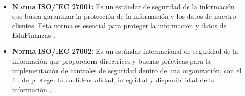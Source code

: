 \begin{itemize}
	\item \textbf{Norma ISO/IEC 27001:} Es un estándar de seguridad de la información que busca garantizar la protección de la información y los datos de nuestro clientes. Esta norma es esencial para proteger la información y datos de EduFinanzas \parencite{ISO27001}.
	
	\item \textbf{Norma ISO/IEC 27002:} Es un estándar internacional de seguridad de la información que proporciona directrices y buenas prácticas para la implementación de controles de seguridad dentro de una organización, con el fin de proteger la confidencialidad, integridad y disponibilidad de la información \parencite{ISO27002}.
\end{itemize}

